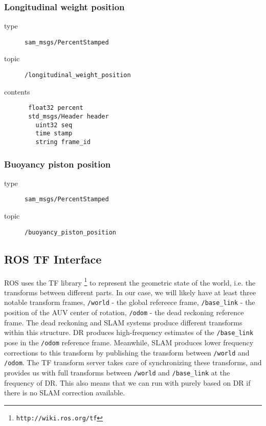 \documentclass[9pt,technote]{IEEEtran} %
\begin{document}
\subsubsection{Longitudinal weight position} 

\begin{description}
\item[type] \texttt{sam\_msgs/PercentStamped}
\item[topic] \texttt{/longitudinal\_weight\_position}
\item[contents] \begin{scriptsize}
\begin{verbatim}
 float32 percent
 std_msgs/Header header
   uint32 seq
   time stamp
   string frame_id
\end{verbatim}
\end{scriptsize}
\end{description}

\subsubsection{Buoyancy piston position}

\begin{description}
\item[type] \texttt{sam\_msgs/PercentStamped}
\item[topic] \texttt{/buoyancy\_piston\_position}
\end{description}

\subsection{ROS TF Interface}
\label{tf}

ROS uses the TF library \footnote{\texttt{http://wiki.ros.org/tf}} to represent
the geometric state of the world, i.e. the transforms between different parts.
In our case, we will likely have at least three notable transform frames,
\texttt{/world} - the global refereece frame,
\texttt{/base\_link} - the position of the AUV center of rotation,
\texttt{/odom} - the dead reckoning reference frame.
The dead reckoning and SLAM systems produce different transforms within
this structure. DR produces high-frequency estimates of the \texttt{/base\_link}
pose in the \texttt{/odom} reference frame. Meanwhile, SLAM produces lower
frequency corrections to this transform by publishing the transform
between \texttt{/world} and \texttt{/odom}. The TF transform server takes
care of synchronizing these transforms, and provides us with
full transforms between \texttt{/world} and \texttt{/base\_link}
at the frequency of DR. This also means that we can run with
purely based on DR if there is no SLAM correction available.
\end{document}
